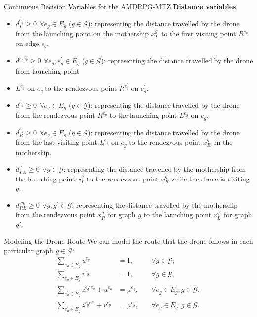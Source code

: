 \documentclass[slidestop,usepdftitle=false,10pt]{beamer}
\begin{document}
    \begin{frame}{Continuous Decision Variables for the AMDRPG-MTZ}
    \textbf{Distance variables}
    \begin{itemize}
        \footnotesize
        \item $d_L^{e_g} \geq 0 \:\: \forall e_g \in E_g$ ($g \in \mathcal{G}$): representing the distance travelled by the drone from the launching point 
         on the mothership  $x_L^g$ to the first visiting point $R^{e_g}$ on edge $e_g$.
        \item $d^{e_ge^\prime_g} \geq 0 \:\: \forall e_g, e^\prime_g \in E_g $ ($g \in \mathcal{G}$): representing the distance travelled by the drone from launching point 
        \item $L^{e_g}$ on $e_g$ to the rendezvous point $R^{e^\prime_g}$ on $e^\prime_g$.
        \item $d^{e_g} \geq 0 \:\: \forall e_g \in E_g$ ($g \in \mathcal{G}$): representing the distance travelled by the drone from the rendezvous point
$R^{e_g}$ to the launching point $L^{e_g}$ on $e_g$. 
        \item $d_R^{e_g} \geq 0 \:\: \forall e_g \in E_g$ ($g \in \mathcal{G}$): representing the distance travelled by the drone from the last visiting point
 $L^{e_g}$ on $e_g$ to the rendezvous point $x_R^g$ on the mothership.
        \item $d_{LR}^g \geq 0 \:\: \forall g \in \mathcal{G}$: representing the distance travelled by the mothership from the launching point
 $x_L^g$ to the rendezvous point $x_R^g$ while the drone is visiting $g$.
        \item $d_{RL}^{gg_\prime} \geq 0 \:\: \forall g, g^{'} \in \mathcal{G}$: representing the distance travelled by the mothership from the 
rendezvous point $x_R^g$ for graph $g$ to the launching point $x_L^{g\prime}$ for graph $g\prime$.
    \end{itemize}
	\end{frame}
	
	\begin{frame}{Modeling the Drone Route}
	We can model the route that the drone follows in each particular graph $g\in \mathcal G$:
	\begin{align}
        \sum_{e_g\in E_g} u^{e_g} & = 1, & \quad\forall g \in \mathcal G, \label{DEnt2}\\%
        \sum_{e_g\in E_g} v^{e_g} & = 1, & \quad\forall g \in \mathcal G, \label{DExt}\\%
        \sum_{e^\prime_g\in E_g} z^{e_g'e_g} + u^{e_g} & = \mu^{e_g}, &\quad\forall e_g\in E_g:g\in\mathcal G, \label{DInu}\\
        \sum_{e^\prime_g\in E_g} z^{e_ge^_g'} + v^{e_g} & = \mu^{e_g}, &\quad\forall e_g\in E_g:g\in\mathcal G. \label{DInv2}
    \end{align}
	\end{frame}
	
\end{document}
